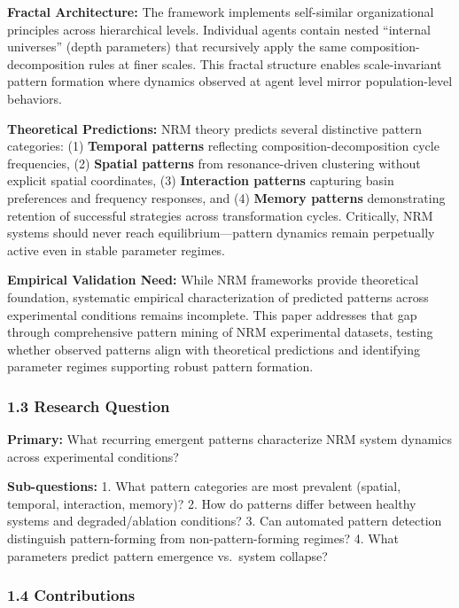 \documentclass[
]{article}
\begin{document}
\textbf{Fractal Architecture:} The framework implements self-similar
organizational principles across hierarchical levels. Individual agents
contain nested ``internal universes'' (depth parameters) that
recursively apply the same composition-decomposition rules at finer
scales. This fractal structure enables scale-invariant pattern formation
where dynamics observed at agent level mirror population-level
behaviors.

\textbf{Theoretical Predictions:} NRM theory predicts several
distinctive pattern categories: (1) \textbf{Temporal patterns}
reflecting composition-decomposition cycle frequencies, (2)
\textbf{Spatial patterns} from resonance-driven clustering without
explicit spatial coordinates, (3) \textbf{Interaction patterns}
capturing basin preferences and frequency responses, and (4)
\textbf{Memory patterns} demonstrating retention of successful
strategies across transformation cycles. Critically, NRM systems should
never reach equilibrium---pattern dynamics remain perpetually active
even in stable parameter regimes.

\textbf{Empirical Validation Need:} While NRM frameworks provide
theoretical foundation, systematic empirical characterization of
predicted patterns across experimental conditions remains incomplete.
This paper addresses that gap through comprehensive pattern mining of
NRM experimental datasets, testing whether observed patterns align with
theoretical predictions and identifying parameter regimes supporting
robust pattern formation.

\subsubsection{1.3 Research Question}\label{research-question}

\textbf{Primary:} What recurring emergent patterns characterize NRM
system dynamics across experimental conditions?

\textbf{Sub-questions:} 1. What pattern categories are most prevalent
(spatial, temporal, interaction, memory)? 2. How do patterns differ
between healthy systems and degraded/ablation conditions? 3. Can
automated pattern detection distinguish pattern-forming from
non-pattern-forming regimes? 4. What parameters predict pattern
emergence vs.~system collapse?

\subsubsection{1.4 Contributions}\label{contributions}
\end{document}
